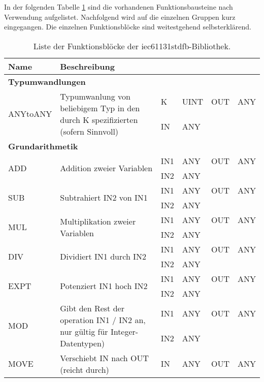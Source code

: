 In der folgenden Tabelle \ref{TAB_Blocks} sind die vorhandenen Funktionsbausteine nach Verwendung aufgelistet. Nachfolgend wird auf die einzelnen Gruppen kurz eingegangen. Die einzelnen Funktionsblöcke sind weitestgehend selbsterklärend.\\
{
\begin{table}
\centering
\renewcommand{\arraystretch}{1.2}
\parbox{12.75cm}{\caption{\label{TAB_Blocks}Liste der Funktionsblöcke der iec61131stdfb-Bibliothek.}}
\begin{tabular}{|m{2cm}|m{7cm}|>{\raggedright}m{0.75cm} >{\raggedleft}m{1cm}|>{\raggedright}m{0.75cm} >{\raggedleft\arraybackslash}m{1cm}|}
\hline
\textbf{Name}&\textbf{Beschreibung}&\multicolumn{2}{|m{1.75cm}}{\textbf{Eingänge}}&\multicolumn{2}{|>{\arraybackslash}m{1.75cm}|}{\textbf{Ausgänge}}\\
\hline
\multicolumn{6}{|l|}{\textbf{Typumwandlungen}}\\
\hline
\multirow{2}{*}{ANYtoANY}&\multirow{2}{7cm}{Typumwanlung von beliebigem Typ in den durch K spezifizierten (sofern Sinnvoll)}& K & UINT& OUT & ANY\\
 & &IN & ANY& &\\
\hline
\multicolumn{6}{|l|}{\textbf{Grundarithmetik}}\\
\hline
\multirow{2}{*}{ADD}&\multirow{2}{7cm}{Addition zweier Variablen}& IN1 & ANY& OUT & ANY\\
 & &IN2 & ANY& &\\
\hline
\multirow{2}{*}{SUB}&\multirow{2}{7cm}{Subtrahiert IN2 von IN1}& IN1 & ANY& OUT & ANY\\
 & &IN2 & ANY& &\\
\hline
\multirow{2}{*}{MUL}&\multirow{2}{7cm}{Multiplikation zweier Variablen}& IN1 & ANY& OUT & ANY\\
 & &IN2 & ANY& &\\
\hline
\multirow{2}{*}{DIV}&\multirow{2}{7cm}{Dividiert IN1 durch IN2}& IN1 & ANY& OUT & ANY\\
 & &IN2 & ANY& &\\
\hline
\multirow{2}{*}{EXPT}&\multirow{2}{7cm}{Potenziert IN1 hoch IN2}& IN1 & ANY& OUT & ANY\\
 & &IN2 & ANY& &\\
\hline
\multirow{2}{*}{MOD}&\multirow{2}{7cm}{Gibt den Rest der operation IN1 / IN2 an, nur gültig für Integer-Datentypen)}& IN1 & ANY& OUT & ANY\\
 & &IN2 & ANY& &\\
\hline
MOVE & Verschiebt IN nach OUT (reicht durch) & IN & ANY & OUT & ANY\\
\hline


\end{tabular}
\end{table}}
